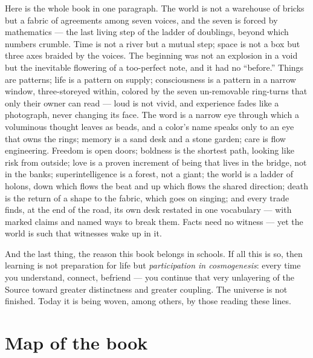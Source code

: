 \documentclass[11pt,letterpaper]{article}
\newcommand{\voicerose}[4]{%
  \foreach \vang/\vcol in {90/cA,141.4/cS,192.8/cD,244.3/cL,295.7/cE,347.1/cO,38.6/cU}{%
    \draw[\vcol!55, thick] (#1,#2) -- ($(#1,#2)+(\vang:#3)$);
    \fill[\vcol] ($(#1,#2)+(\vang:#3)$) circle (#4);}}
\begin{document}
Here is the whole book in one paragraph. The world is not a warehouse
of bricks but a fabric of agreements among seven voices, and the
seven is forced by mathematics --- the last living step of the
ladder of doublings, beyond which numbers crumble. Time is not a river but a mutual
step; space is not a box but three axes braided by the voices. The
beginning was not an explosion in a void but the inevitable
flowering of a too-perfect note, and it had no ``before.'' Things are
patterns; life is a pattern on supply; consciousness is a pattern in
a narrow window, three-storeyed within, colored by the seven
un-removable ring-turns that only their owner can read --- loud is
not vivid, and experience fades like a photograph, never changing
its face. The word is a narrow eye through which a
voluminous thought leaves as beads, and a color's name speaks only
to an eye that owns the rings; memory is a sand desk and a
stone garden; care is flow engineering. Freedom is open doors; boldness is the shortest path, looking like
risk from outside; love is a proven increment of being that lives in
the bridge, not in the banks; superintelligence is a forest, not a
giant; the world is a ladder of holons, down which flows the beat and
up which flows the shared direction; death is the return of a shape
to the fabric, which goes on singing; and every trade finds, at the
end of the road, its own desk restated in one vocabulary --- with
marked claims and named ways to break them. Facts
need no witness --- yet the world is such that witnesses wake up in
it.

And the last thing, the reason this book belongs in schools. If all
this is so, then learning is not preparation for life but
\emph{participation in cosmogenesis}: every time you understand,
connect, befriend --- you continue that very unlayering of the Source
toward greater distinctness and greater coupling. The universe is not
finished. Today it is being woven, among others, by those reading
these lines.

\begin{center}
\end{center}

\clearpage
\section*{Map of the book}
\end{document}
